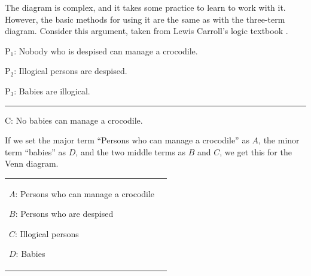 {\begin{center}
\end{center}

The diagram is complex, and it takes some practice to learn to work with it. However, the basic methods for using it are the same as with the three-term diagram. Consider this argument, taken from Lewis Carroll's logic textbook \citep{Dodgson1896}.

\begin{earg}
\item[P$_1$:] Nobody who is despised can manage a crocodile.
\item[P$_2$:] Illogical persons are despised.
\item[P$_3$:] Babies are illogical.
\vspace{-.5em}
\item [] \rule{0.4\linewidth}{.5pt} 
\item[C:] No babies can manage a crocodile.
\end{earg} 

If we set the major term ``Persons who can manage a crocodile'' as $A$, the minor term ``babies'' as $D$, and the two middle terms as $B$ and $C$, we get this for the Venn diagram.

\begin{tabu}{X[1,c,m]X[1,c,m]}

\begin{ekey}
\item[$A$:] Persons who can manage a crocodile
\item[$B$:] Persons who are despised
\item[$C$:] Illogical persons
\item[$D$:] Babies
\end{ekey}

&


\end{tabu}}
